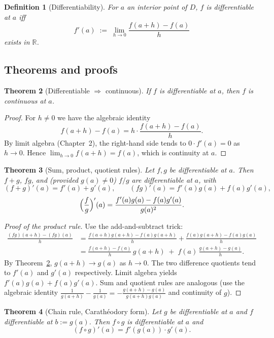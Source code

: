 \documentclass[11pt]{article}
\newtheorem{theorem}{Theorem}[section]
\newtheorem{definition}[theorem]{Definition}
\theoremstyle{remark}
\begin{document}
\begin{definition}[Differentiability]
For $a$ an interior point of $D$, $f$ is \emph{differentiable at $a$} iff
\[
f'(a)\;:=\;\lim_{h\to 0}\frac{f(a+h)-f(a)}{h}
\]
exists in $\mathbb{R}$.
\end{definition}

\subsection*{Theorems and proofs}

\begin{theorem}[Differentiable $\Rightarrow$ continuous]\label{thm:diffcont}
If $f$ is differentiable at $a$, then $f$ is continuous at $a$.
\end{theorem}

\begin{proof}
For $h\ne 0$ we have the algebraic identity
\[
f(a+h)-f(a)=h\cdot\frac{f(a+h)-f(a)}{h}.
\]
By limit algebra (Chapter~2), the right-hand side tends to $0\cdot f'(a)=0$ as $h\to 0$. Hence $\lim_{h\to 0}f(a+h)=f(a)$, which is continuity at $a$.
\end{proof}

\begin{theorem}[Sum, product, quotient rules]\label{thm:rules}
Let $f,g$ be differentiable at $a$. Then $f+g$, $fg$, and (provided $g(a)\ne 0$) $f/g$ are differentiable at $a$, with
\[
(f+g)'(a)=f'(a)+g'(a),\qquad (fg)'(a)=f'(a)g(a)+f(a)g'(a),
\]
\[
\Bigl(\frac{f}{g}\Bigr)'(a)=\frac{f'(a)g(a)-f(a)g'(a)}{g(a)^2}.
\]
\end{theorem}

\begin{proof}[Proof of the product rule]
Use the add-and-subtract trick:
\begin{align*}
\frac{(fg)(a+h)-(fg)(a)}{h}
&=\frac{f(a+h)g(a+h)-f(a)g(a+h)}{h}+\frac{f(a)g(a+h)-f(a)g(a)}{h}\\
&=\frac{f(a+h)-f(a)}{h}\,g(a+h)\;+\;f(a)\,\frac{g(a+h)-g(a)}{h}.
\end{align*}
By Theorem~\ref{thm:diffcont}, $g(a+h)\to g(a)$ as $h\to 0$. The two difference quotients tend to $f'(a)$ and $g'(a)$ respectively. Limit algebra yields $f'(a)g(a)+f(a)g'(a)$. Sum and quotient rules are analogous (use the algebraic identity $\tfrac{1}{g(a+h)}-\tfrac{1}{g(a)}=-\tfrac{g(a+h)-g(a)}{g(a+h)g(a)}$ and continuity of $g$).
\end{proof}

\begin{theorem}[Chain rule, Carath\'eodory form]\label{thm:chain}
Let $g$ be differentiable at $a$ and $f$ differentiable at $b:=g(a)$. Then $f\circ g$ is differentiable at $a$ and
\[
(f\circ g)'(a)=f'(g(a))\cdot g'(a).
\]
\end{theorem}
\end{document}
